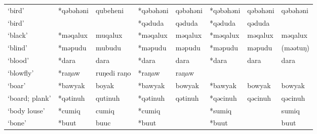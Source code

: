 \begin{landscape}
\begin{longtable}[c]{@{}p{3cm}<{\raggedright}p{2.75cm}<{\raggedright}p{2.75cm}<{\raggedright}p{2.75cm}<{\raggedright}p{2.75cm}<{\raggedright}p{2.75cm}<{\raggedright}p{2.75cm}<{\raggedright}p{2.75cm}<{\raggedright}@{}}
`bird'                                               & *qəbəhəni    & qubeheni                      & *qəbəhəni      & qəbəhəni                   & *qəbəhəni        & qəbəhəni                 & qəbəhəni                          \\
`bird'                                               &              &                               & *qəduda        & qəduda                     & *qəduda          & qəduda                   &                                   \\
`black'                                              & *məqalux     & muqalux                       & *məqalux       & məqalux                    & *məqalux         & məqalux                  & məqalux                           \\
`blind'                                              & *məpudu      & mubudu                        & *məpudu        & məpudu                     & *məpudu          & məpudu                   & (məətuŋ)                          \\
`blood'                                              & *dara        & dara                          & *dara          & dara                       & *dara            & dara                     & dara                              \\
`blowfly'                                            & *raŋaw       & ruŋedi raŋo                   & *raŋaw         & raŋaw                      &                  &                          &                                   \\
`boar'                                               & *bawyak      & boyak                         & *bawyak        & bowyak                     & *bawyak          & bowyak                   & bowyak                            \\
`board; plank'                                       & *qətinuh     & qutinuh                       & *qətinuh       & qətinuh                    & *qəcinuh         & qəcinuh                  & qəcinuh                           \\
`body louse'                                         & *cumiq       & cumiq                         & *cumiq         &                            & *sumiq           &                          & sumiq                             \\
`bone'                                               & *buut        & buuc                          & *buut          &                            & *buut            &                          & buut                              \\

\end{longtable}
\end{landscape}
